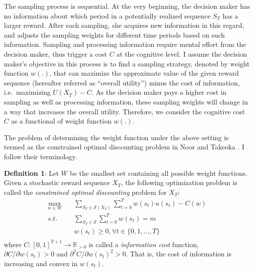 \documentclass[
  12pt,
]{article}
\begin{document}
The sampling process is sequential. At the very beginning, the decision
maker has no information about which period in a potentially realized
sequence \(S_T\) has a larger reward. After each sampling, she acquires
new information in this regard, and adjusts the sampling weights for
different time periods based on such information. Sampling and
processing information require mental effort from the decision maker,
thus trigger a cost \(C\) at the cognitive level. I assume the decision
maker's objective in this process is to find a sampling strategy,
denoted by weight function \(w(.)\), that can maximize the approximate
value of the given reward sequence (hereafter referred as ``overall
utility'') minus the cost of information, i.e.~maximizing \(U(X_T)-C\).
As the decision maker pays a higher cost in sampling as well as
processing information, these sampling weights will change in a way that
increases the overall utility. Therefore, we consider the cognitive cost
\(C\) as a functional of weight function \(w(.)\).

The problem of determining the weight function under the above setting
is termed as the constrained optimal discounting problem in Noor and
Takeoka
\citetext{\citeyear{noor_optimal_2022}; \citeyear{noor_constrained_2023}}.
I follow their terminology.

\textbf{Definition 1}: Let \(W\) be the smallest set containing all
possible weight functions. Given a stochastic reward sequence \(X_T\),
the following optimization problem is called the \emph{constrained
optimal discounting} problem for \(X_T\):\[ 
\begin{aligned}
\max_{w\in W}  \quad & \sum_{S_T\in \mathcal{S}(X_T)}\sum_{t=0}^T w(s_t)u(s_t) - C(w) \\
s.t. \quad &  \sum_{S_T\in \mathcal{S}}\sum_{t=0}^T w(s_t)=m \\
& w(s_t)\geq 0, \forall t\in\{0,1,…,T\} \\
\end{aligned}
\]where \(C:[0,1]^{T+1}\rightarrow \mathbb{R}_{>0}\) is called a
\emph{information cost} function, \(\partial C/\partial w(s_t)>0\) and
\(\partial^2 C/\partial w(s_t)^2>0\). That is, the cost of information
is increasing and convex in \(w(s_t)\).
\end{document}
